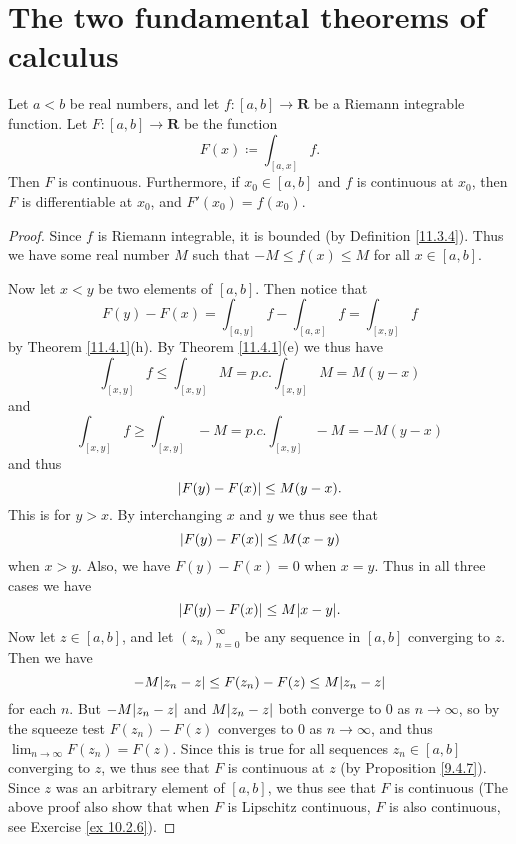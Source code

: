 \section{The two fundamental theorems of calculus}\label{sec 11.9}

\begin{theorem}\label{11.9.1}
    Let \(a < b\) be real numbers, and let \(f : [a, b] \to \mathbf{R}\) be a Riemann integrable function.
    Let \(F : [a, b] \to \mathbf{R}\) be the function
    \[
        F(x) \coloneqq \int_{[a, x]} f.
    \]
    Then \(F\) is continuous.
    Furthermore, if \(x_0 \in [a, b]\) and \(f\) is continuous at \(x_0\), then \(F\) is differentiable at \(x_0\), and \(F'(x_0) = f(x_0)\).
\end{theorem}

\begin{proof}
    Since \(f\) is Riemann integrable, it is bounded (by Definition \ref{11.3.4}).
    Thus we have some real number \(M\) such that \(-M \leq f(x) \leq M\) for all \(x \in [a, b]\).

    Now let \(x < y\) be two elements of \([a, b]\).
    Then notice that
    \[
        F(y) - F(x) = \int_{[a, y]} f - \int_{[a, x]} f = \int_{[x, y]} f
    \]
    by Theorem \ref{11.4.1}(h).
    By Theorem \ref{11.4.1}(e) we thus have
    \[
        \int_{[x, y]} f \leq \int_{[x, y]} M = p.c. \int_{[x, y]} M = M(y - x)
    \]
    and
    \[
        \int_{[x, y]} f \geq \int_{[x, y]} -M = p.c. \int_{[x, y]} -M = -M(y - x)
    \]
    and thus
    \[
        \abs*{F(y) - F(x)} \leq M(y - x).
    \]
    This is for \(y > x\).
    By interchanging \(x\) and \(y\) we thus see that
    \[
        \abs*{F(y) - F(x)} \leq M(x - y)
    \]
    when \(x > y\).
    Also, we have \(F(y) - F(x) = 0\) when \(x = y\).
    Thus in all
    three cases we have
    \[
        \abs*{F(y) - F(x)} \leq M \abs*{x - y}.
    \]
    Now let \(z \in [a, b]\), and let \((z_n)_{n = 0}^\infty\) be any sequence in \([a, b]\) converging to \(z\).
    Then we have
    \[
        -M \abs*{z_n - z} \leq F(z_n) - F(z) \leq M \abs*{z_n - z}
    \]
    for each \(n\).
    But \(-M \abs*{z_n - z}\) and \(M \abs*{z_n - z}\) both converge to \(0\) as \(n \to \infty\), so by the squeeze test \(F(z_n) - F(z)\) converges to \(0\) as \(n \to \infty\), and thus \(\lim_{n \to \infty} F(z_n) = F(z)\).
    Since this is true for all sequences \(z_n \in [a, b]\) converging to \(z\), we thus see that \(F\) is continuous at \(z\) (by Proposition \ref{9.4.7}).
    Since \(z\) was an arbitrary element of \([a, b]\), we thus see that \(F\) is continuous
    (The above proof also show that when \(F\) is Lipschitz continuous, \(F\) is also continuous, see Exercise \ref{ex 10.2.6}).


\end{proof}
